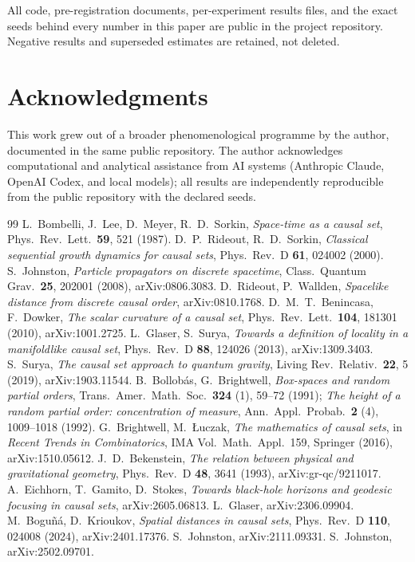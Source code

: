 \documentclass[11pt,a4paper]{article}
\begin{document}
All code, pre-registration documents, per-experiment results files, and the
exact seeds behind every number in this paper are public in the project
repository. Negative results and superseded estimates are retained, not
deleted.

\section*{Acknowledgments}

This work grew out of a broader phenomenological programme by the author,
documented in the same public repository. The author acknowledges
computational and analytical assistance from AI systems (Anthropic Claude,
OpenAI Codex, and local models); all results are independently reproducible
from the public repository with the declared seeds.

\begin{thebibliography}{99}
 L.~Bombelli, J.~Lee, D.~Meyer, R.~D.~Sorkin,
  \emph{Space-time as a causal set}, Phys.\ Rev.\ Lett.\ \textbf{59}, 521
  (1987).
 D.~P.~Rideout, R.~D.~Sorkin, \emph{Classical
  sequential growth dynamics for causal sets}, Phys.\ Rev.\ D \textbf{61},
  024002 (2000).
 S.~Johnston, \emph{Particle propagators on discrete
  spacetime}, Class.\ Quantum Grav.\ \textbf{25}, 202001 (2008),
  arXiv:0806.3083.
 D.~Rideout, P.~Wallden, \emph{Spacelike distance
  from discrete causal order}, arXiv:0810.1768.
 D.~M.~T.~Benincasa, F.~Dowker, \emph{The scalar
  curvature of a causal set}, Phys.\ Rev.\ Lett.\ \textbf{104}, 181301 (2010),
  arXiv:1001.2725.
 L.~Glaser, S.~Surya, \emph{Towards a definition of
  locality in a manifoldlike causal set}, Phys.\ Rev.\ D \textbf{88}, 124026
  (2013), arXiv:1309.3403.
 S.~Surya, \emph{The causal set approach to quantum
  gravity}, Living Rev.\ Relativ.\ \textbf{22}, 5 (2019), arXiv:1903.11544.
 B.~Bollob\'as, G.~Brightwell, \emph{Box-spaces and random
  partial orders}, Trans.\ Amer.\ Math.\ Soc.\ \textbf{324} (1), 59--72
  (1991); \emph{The height of a random partial order: concentration of
  measure}, Ann.\ Appl.\ Probab.\ \textbf{2} (4), 1009--1018 (1992).
 G.~Brightwell, M.~\L uczak, \emph{The mathematics
  of causal sets}, in \emph{Recent Trends in Combinatorics}, IMA Vol.\ Math.\
  Appl.\ 159, Springer (2016), arXiv:1510.05612.
 J.~D.~Bekenstein, \emph{The relation between
  physical and gravitational geometry}, Phys.\ Rev.\ D \textbf{48}, 3641
  (1993), arXiv:gr-qc/9211017.
 A.~Eichhorn, T.~Gamito, D.~Stokes, \emph{Towards
  black-hole horizons and geodesic focusing in causal sets},
  arXiv:2605.06813.
 L.~Glaser, arXiv:2306.09904.
 M.~Bogu\~n\'a, D.~Krioukov, \emph{Spatial
  distances in causal sets}, Phys.\ Rev.\ D \textbf{110}, 024008 (2024),
  arXiv:2401.17376.
 S.~Johnston, arXiv:2111.09331.
 S.~Johnston, arXiv:2502.09701.
\end{thebibliography}
\end{document}
